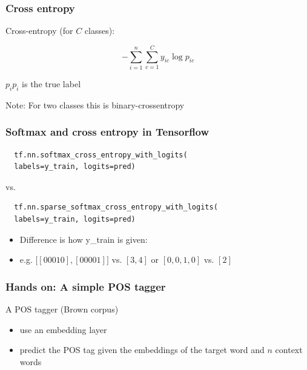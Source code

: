\documentclass{beamer}
\begin{document}
\begin{frame}
  \frametitle{Cross entropy}
  
%

  Cross-entropy (for $C$ classes):

  \begin{displaymath}
    - \sum_{i=1}^n\sum_{c=1}^C y_{ic}\log{p_{ic}}
  \end{displaymath}

$p_{i} p_{i}$ is the true label

  Note: For two classes this is binary-crossentropy


\end{frame}

\begin{frame}[fragile]
  \frametitle{Softmax and cross entropy in Tensorflow}

\begin{lstlisting}
  tf.nn.softmax_cross_entropy_with_logits(
  labels=y_train, logits=pred)
\end{lstlisting}

vs.

\begin{lstlisting}
  tf.nn.sparse_softmax_cross_entropy_with_logits(
  labels=y_train, logits=pred)
\end{lstlisting}

  \begin{itemize}
 \item Difference is how y\_train is given:
 \item e.g. $\big[[0 0 0 1 0], [0 0 0 0 1]\big]$ vs. $[3,4]$ or $[0,0,1,0]$ vs. $[2]$
  \end{itemize}

\end{frame}

\begin{frame}
  \frametitle{Hands on: A simple POS tagger}

  A POS tagger (Brown corpus)

  \begin{itemize}
  \item use an embedding layer
  \item predict the POS tag given the embeddings of the target word and $n$
    context words
  \end{itemize}
  
\end{frame}
\end{document}
